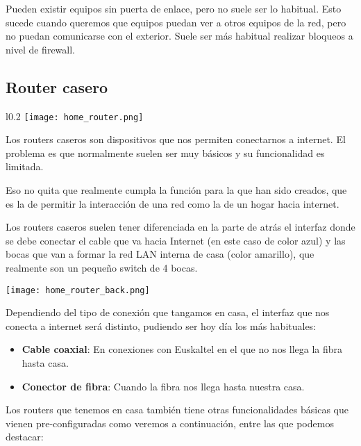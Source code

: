 Pueden existir equipos sin puerta de enlace, pero no suele ser lo habitual. Esto sucede cuando queremos que equipos puedan ver a otros equipos de la red, pero no puedan comunicarse con el exterior. Suele ser más habitual realizar bloqueos a nivel de firewall.

\subsection{Router casero}
\begin{wrapfigure}{l}{0.2\linewidth}
    \centering
    \vspace{-20pt}
    \texttt{[image: home\_router.png]}
    \vspace{-32pt}
\end{wrapfigure}
Los routers caseros son dispositivos que nos permiten conectarnos a internet. El problema es que normalmente suelen ser muy básicos y su funcionalidad es limitada.

Eso no quita que realmente cumpla la función para la que han sido creados, que es la de permitir la interacción de una red como la de un hogar hacia internet.

Los routers caseros suelen tener diferenciada en la parte de atrás el interfaz donde se debe conectar el cable que va hacia Internet (en este caso de color azul) y las bocas que van a formar la red LAN interna de casa (color amarillo), que realmente son un pequeño switch de 4 bocas.

\begin{center}
    \vspace{-15pt}
    \texttt{[image: home\_router\_back.png]}
    \vspace{-4pt}
    \vspace{-15pt}
\end{center}


Dependiendo del tipo de conexión que tangamos en casa, el interfaz que nos conecta a internet será distinto, pudiendo ser hoy día los más habituales:

\begin{itemize}
    \item \textbf{Cable coaxial}: En conexiones con Euskaltel en el que no nos llega la fibra hasta casa.
    \item \textbf{Conector de fibra}: Cuando la fibra nos llega hasta nuestra casa.
\end{itemize}

Los routers que tenemos en casa también tiene otras funcionalidades básicas que vienen pre-configuradas como veremos a continuación, entre las que podemos destacar:

